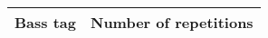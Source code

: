 \documentclass{article}
\begin{document}
\begin{table}
\begin{center}
\begin{tabular}{  l | r }
\hline
Bass tag & Number of repetitions \\
\hline
\hline

\end{tabular}
\end{center}
\end{table}
\end{document}
